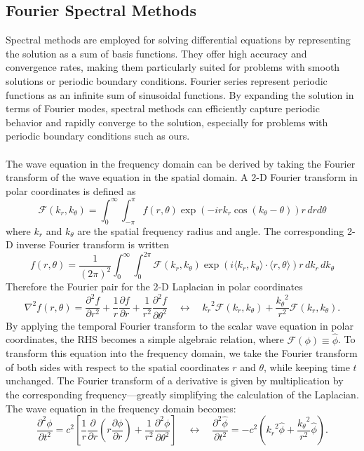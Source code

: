 \documentclass{homework}
\begin{document}
\subsection{\textbf{Fourier Spectral Methods}} Spectral methods are employed for solving differential equations by representing the solution as a sum of basis functions. They offer high accuracy and convergence rates, making them particularly suited for problems with smooth solutions or periodic boundary conditions. Fourier series represent periodic functions as an infinite sum of sinusoidal functions. By expanding the solution in terms of Fourier modes, spectral methods can efficiently capture periodic behavior and rapidly converge to the solution, especially for problems with periodic boundary conditions such as ours.
\\ \\ \noindent
The wave equation in the frequency domain can be derived by taking the Fourier transform of the wave equation in the spatial domain. A 2-D Fourier transform in polar coordinates is defined as 
$$ \mathcal{F}(k_r, k_\theta) = \int_0^\infty \int_{-\pi}^\pi f(r, \theta) \exp(-i r k_r \cos(k_\theta - \theta)) r \, dr d\theta $$
\noindent
where $k_r$ and $k_\theta$ are the spatial frequency radius and angle. The corresponding 2-D inverse Fourier transform is written
$$ f(r, \theta) = \frac{1}{(2 \pi)^2} \int_0^\infty \int_{0}^{2\pi} \mathcal{F}(k_r, k_\theta) \exp(i \langle k_r, k_\theta \rangle \cdot \langle r, \theta \rangle) r \, d k_r \, d k_\theta $$
\noindent
Therefore the Fourier pair for the 2-D Laplacian in polar coordinates \cite{Baddour2011, Costa2004}
$$ \nabla^2 f(r, \theta) = \frac{\partial^2 f}{\partial r^2} + \frac{1}{r} \frac{\partial f}{\partial r} + \frac{1}{r^2} \frac{\partial^2 f}{\partial \theta^2} \quad \longleftrightarrow \quad {k_r}^2 \mathcal{F}(k_r, k_\theta) + \frac{{k_{\theta}}^2}{r^2} \mathcal{F}(k_r, k_\theta) .$$
\noindent
By applying the temporal Fourier transform to the scalar wave equation in polar coordinates, the RHS becomes a simple algebraic relation, where $\mathcal{F}(\phi) \equiv \hat{\phi}$. To transform this equation into the frequency domain, we take the Fourier transform of both sides with respect to the spatial coordinates $r$ and $\theta$, while keeping time $t$ unchanged. The Fourier transform of a derivative is given by multiplication by the corresponding frequency---greatly simplifying the calculation of the Laplacian. The wave equation in the frequency domain becomes:
$$ \frac{{\partial^2 \phi}}{{\partial t^2}} = c^2 \left[ \frac{1}{r} \frac{\partial}{\partial r} \left(r \frac{\partial \phi}{\partial r}\right) + \frac{1}{r^2} \frac{\partial^2 \phi}{\partial \theta^2} \right] \quad \longleftrightarrow \quad \frac{{\partial^2 \hat{\phi}}}{{\partial t^2}} = -c^2 \left( {k_r}^2 \hat{\phi} + \frac{{k_{\theta}}^2}{r^2} \hat{\phi} \right).$$
\end{document}
